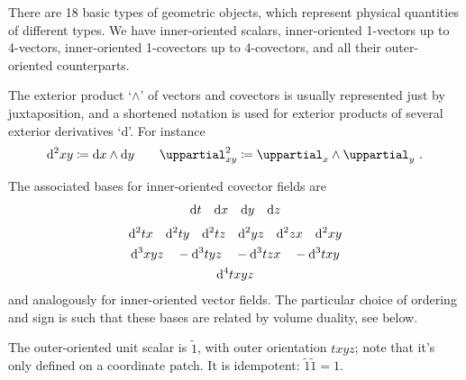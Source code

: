 \documentclass[\ifafour a4paper,12pt,\else a5paper,10pt,\fi%
onecolumn,oneside,article,%
british%
]{memoir}
\theoremstyle{remark}
\theoremstyle{innote}
\newcommand*{\de}{\uppartial}%
\newcommand*{\di}{\mathrm{d}}%
\newcommand*{\defd}{\coloneqq}
\renewcommand*{\|}[1][]{\nonscript\:#1\vert\nonscript\:\mathopen{}}
\newcommand*{\si}[1]{\di{#1}}
\newcommand*{\ssi}[1]{\di^{2}{#1}}
\newcommand*{\sssi}[1]{\di^{3}{#1}}
\newcommand*{\ssssi}[1]{\di^{4}{#1}}
\newcommand*{\tw}[1]{\tilde{#1}}
\begin{document}
There are 18 basic types of geometric objects, which represent physical quantities of different types. We have inner-oriented scalars, inner-oriented 1-vectors up to 4-vectors, inner-oriented 1-covectors up to 4-covectors, and all their outer-oriented counterparts.

The exterior product \enquote*{$\land$} of vectors and covectors is usually represented just by juxtaposition, and a shortened notation is used for exterior products of several exterior derivatives \enquote*{$\di$}. For instance
\begin{equation}
  \label{eq:notation_dwedge}
  \di^{2}xy \defd \di x \land \di y
  \qquad
  \de^{2}_{xy} \defd \de_{x} \land \de_{y} \ .
\end{equation}

The associated bases for inner-oriented covector fields are
\begin{gather}
  \label{eq:basis_1vec}
  \si{t}\quad
  \si{x}\quad
  \si{y}\quad
  \si{z}
  \\[\jot]
  \label{eq:basis_2vec}
  \ssi{tx}\quad
  \ssi{ty}\quad
  \ssi{tz}\quad
  \ssi{yz}\quad
  \ssi{zx}\quad
  \ssi{xy}
  \\
  \label{eq:basis_3vec}
  \sssi{xyz}\quad
  -\sssi{tyz}\quad
  -\sssi{tzx}\quad
  -\sssi{txy}
  \\
  \label{eq:basis_4vec}
  \ssssi{txyz}
\end{gather}
and analogously for inner-oriented vector fields. The particular choice of ordering and sign is such that these bases are related by volume duality, see below.

The outer-oriented unit scalar is $\tw{1}$, with outer orientation $txyz$; note that it's only defined on a coordinate patch. It is idempotent: $\tw{1}\tw{1} =1$.
\end{document}
